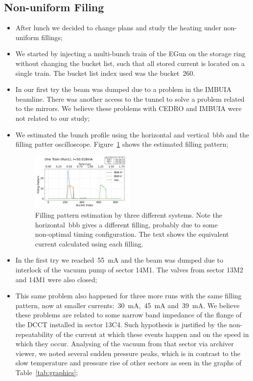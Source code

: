 \documentclass[a4paper,
               biblatex,     %
               ]{jacow}
\begin{document}
\subsection{Non-uniform Filing}
\begin{itemize}
    \item After lunch we decided to change plans and study the heating under non-uniform fillings;
    \item We started by injecting a multi-bunch train of the EGun on the storage ring without changing the bucket list, such that all stored current is located on a single train. The bucket list index used was the bucket~\num{260}.
    \item In our first try the beam was dumped due to a problem in the IMBUIA beamline. There was another access to the tunnel to solve a problem related to the mirrors. We believe these problems with CEDRO and IMBUIA were not related to our study;
    \item We estimated the bunch profile using the horizontal and vertical~\gls{bbb} and the filling patter oscilloscope. Figure~\ref{fig:2023-07-25_onetrain_fill} shows the estimated filling pattern;
    \begin{figure}
        \centering
        \includegraphics[width=0.48\textwidth]{2023-07-25_onetrain_run1_curr50p028mA.png}
        \caption{Filling pattern estimation by three different systems. Note the horizontal~\gls{bbb} gives a different filling, probably due to some non-optimal timing configuration. The text shows the equivalent current calculated using each filling.}
        \label{fig:2023-07-25_onetrain_fill}
    \end{figure}
    \item In the first try we reached~\SI{55}{\milli\ampere} and the beam was dumped due to interlock of the vacuum pump of sector 14M1. The valves from sector 13M2 and 14M1 were also closed;
    \item This same problem also happened for three more runs with the same filling pattern, now at smaller currents:~\SI{30}{\milli\ampere},~\SI{45}{\milli\ampere} and~\SI{39}{\milli\ampere}. We believe these problems are related to some narrow band impedance of the flange of the DCCT installed in sector 13C4. Such hypothesis is justified by the non-repeatability of the current at which these events happen and on the speed in which they occur. Analysing of the vacuum from that sector via archiver viewer, we noted several sudden pressure peaks, which is in contrast to the slow temperature and pressure rise of other sectors as seen in the graphs of Table~\ref{tab:graphics};

\end{itemize}
\end{document}
